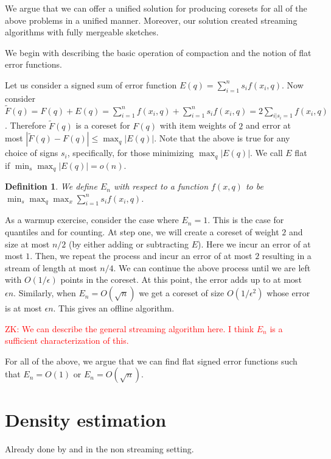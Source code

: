 \documentclass{article} %
\newcommand{\zk}[1]{\textcolor{red}{ZK: #1}}
\newcommand{\eps}{\epsilon}
\newtheorem{definition}{Definition}
\begin{document}
We argue that we can offer a unified solution for producing coresets for all of the above problems in a unified manner. 
Moreover, our solution created streaming algorithms with fully mergeable sketches. 

We begin with describing the basic operation of compaction and the notion of flat error functions. 

Let us consider a signed sum of error function $E(q) = \sum_{i=1}^{n} s_i f(x_i,q)$.
Now consider $\tilde F(q) = F(q) + E(q) = \sum_{i=1}^{n} f(x_i,q)  + \sum_{i=1}^{n} s_i f(x_i,q)  = 2 \sum_{i | s_i=1} f(x_i,q)$.
Therefore $\tilde F(q)$ is a coreset for $F(q)$ with item weights of $2$ and error at most $|\tilde F(q) - F(q)| \le \max_q | E(q)|$.
Note that the above is true for any choice of signs $s_i$, specifically, for those minimizing $\max_q | E(q)|$.
We call $E$ flat if $\min_s \max_q |E(q)| = o(n)$. 

\begin{definition}
We define $E_n$ with respect to a function $f(x,q)$ to be  $\min_s \max_q \max_x \sum_{i=1}^{n} s_i f(x_i,q)$. 
\end{definition}

As a warmup exercise, consider the case where $E_n = 1$.
This is the case for quantiles and for counting. 
At step one, we will create a coreset of weight $2$ and size at most $n/2$ (by either adding or subtracting $E$). Here we incur an error of at most $1$.
Then, we repeat the process and incur an error of at most $2$ resulting in a stream of length at most $n/4$. 
We can continue the above process until we are left with $O(1/\eps)$ points in the coreset. At this point, the error adds up to at most $\eps n$.
Similarly, when $E_n = O(\sqrt{n})$ we get a coreset of size $O(1/\eps^2)$ whose error is at most $\eps n$.
This gives an offline algorithm.

\zk{We can describe the general streaming algorithm here. I think $E_n$ is a sufficient characterization of this.} 


For all of the above, we argue that we can find flat signed error functions such that $E_n = O(1)$ or $E_n = O(\sqrt{n})$.




\section{Density estimation}

Already done by \cite{DBLP:conf/soda/PhillipsT18} and \cite{DBLP:journals/corr/abs-1802-01751} in the non streaming setting.
\end{document}
